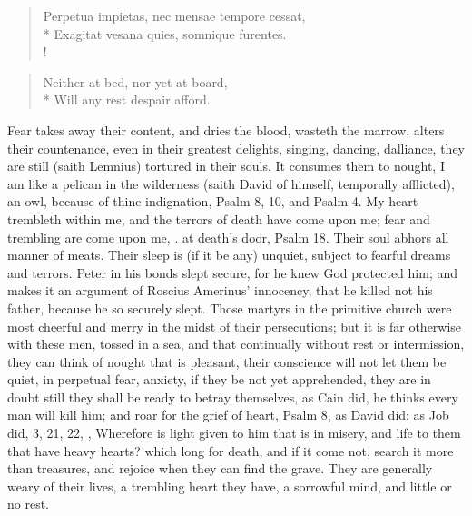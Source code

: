 {\begin{latin}
\begin{verse}%
Perpetua impietas, nec mensae tempore cessat,\\*
Exagitat vesana quies, somnique furentes.\\!
\end{verse}%
\end{latin}
\translationrule%
\begin{verse}
Neither at bed, nor yet at board,\\*
Will any rest despair afford.
\end{verse}

Fear takes away their content, and dries the blood, wasteth the marrow,
alters their countenance, even in their greatest delights, singing,
dancing, dalliance, they are still (saith Lemnius) tortured in
their souls. It consumes them to nought, I am like a pelican in the
wilderness (saith David of himself, temporally afflicted), an owl,
because of thine indignation, Psalm  8, 10, and Psalm  4. My
heart trembleth within me, and the terrors of death have come upon me;
fear and trembling are come upon me, \etc{}. at death's door, Psalm 
18. Their soul abhors all manner of meats. Their sleep is (if it
be any) unquiet, subject to fearful dreams and terrors. Peter in his
bonds slept secure, for he knew God protected him; and \Tully makes it
an argument of Roscius Amerinus' innocency, that he killed not his
father, because he so securely slept. Those martyrs in the primitive
church were most cheerful and merry in the midst of their
persecutions; but it is far otherwise with these men, tossed in a sea,
and that continually without rest or intermission, they can think of
nought that is pleasant, their conscience will not let them be
quiet, in perpetual fear, anxiety, if they be not yet apprehended, they
are in doubt still they shall be ready to betray themselves, as Cain
did, he thinks every man will kill him; and roar for the grief of
heart, Psalm  8, as David did; as Job did,  3, 21, 22, \etc{},
Wherefore is light given to him that is in misery, and life to them
that have heavy hearts? which long for death, and if it come not,
search it more than treasures, and rejoice when they can find the
grave. They are generally weary of their lives, a trembling heart they
have, a sorrowful mind, and little or no rest. }
